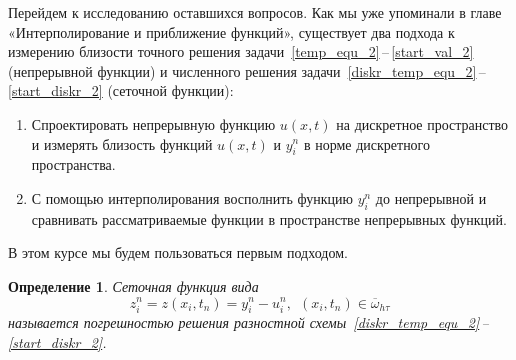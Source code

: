 \documentclass[11pt,a4paper,twoside,listtotoc,bibtotoc]{report}
\numberwithin{equation}{section}
\newtheorem*{definition}{Определение}
\theoremstyle{definition}
\theoremstyle{plain}
\begin{document}
Перейдем к исследованию оставшихся вопросов. Как мы уже упоминали в главе «Интерполирование и приближение функций»,
существует два подхода к измерению близости точного решения
задачи~\eqref{temp_equ_2}\,--\,\eqref{start_val_2} (непрерывной функции) и
численного решения задачи~\eqref{diskr_temp_equ_2}\,--\,\eqref{start_diskr_2}
(сеточной функции):
%
\begin{enumerate}
%
    \item
    Спроектировать непрерывную функцию $u(x,t)$ на дискретное пространство
    и измерять близость функций $u(x,t)$ и $y_i^n$ в норме дискретного пространства.
    \item
    С помощью интерполирования восполнить функцию $y_i^n$ до непрерывной
    и сравнивать рассматриваемые функции в пространстве непрерывных функций.
%
\end{enumerate}
%
В этом курсе мы будем пользоваться первым подходом.

\begin{definition}
%
    Сеточная функция вида
    \begin{equation}
        \label{approx_temp}
        z_i^n=z(x_i, t_n)=y_i^n-u_i^n,~~(x_i, t_n) \in \overline{\omega}_{h\tau}
    \end{equation}
    называется погрешностью решения разностной схемы~\eqref{diskr_temp_equ_2}\,--\,\eqref{start_diskr_2}.
\end{definition}
%
\end{document}
